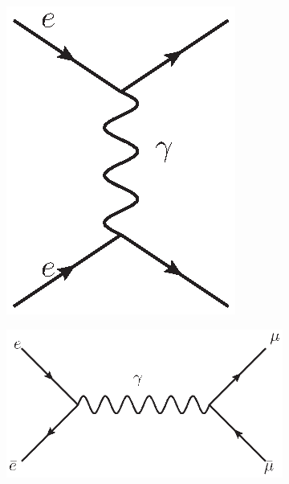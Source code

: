 \begin{figure}[!htbp]
    \centering
    \begin{subfigure}[b]{0.25\textwidth}
        \includegraphics[width=\linewidth,scale=0.5]{figures/scattering.eps}
        \caption{}
        \label{fig:PhotonScattering}
    \end{subfigure}%
    \begin{subfigure}[b]{0.5\textwidth}
        \includegraphics[width=\linewidth]{figures/fermionGammaTrans.eps}

\end{subfigure}
\end{figure}
